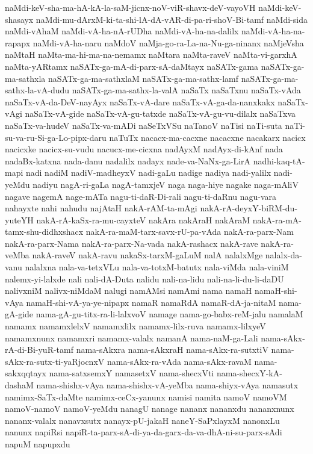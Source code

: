 {naMdi-keV-sha-ma-hA-kA-la-saM-jicnx-noV-viR-shavx-deV-vayoVH
naMdi-keV-shasayx
naMdi-mu-dArxM-ki-ta-shi-lA-dA-vAR-di-pa-ri-shoV-Bi-tamf
naMdi-sida
naMdi-vAhaM
naMdi-vA-ha-nA-rUDha
naMdi-vA-ha-na-dalilx
naMdi-vA-ha-na-rapapx
naMdi-vA-ha-naru
naMdoV
naMja-go-ra-La-na-Nu-ga-ninanx
naMjeVsha
naMtaH
naMta-ma-hi-ma-na-nemamx
naMtara
naMta-raveV
naMta-vi-garxhA
naMta-yARtamx
naSATx-ga-mA-di-parx-sA-daMtayx
naSATx-gama
naSATx-ga-ma-sathxla
naSATx-ga-ma-sathxlaM
naSATx-ga-ma-sathx-lamf
naSATx-ga-ma-sathx-la-vA-dudu
naSATx-ga-ma-sathx-la-valA
naSaTx
naSaTxnu
naSaTx-vAda
naSaTx-vA-da-DeV-nayAyx
naSaTx-vA-dare
naSaTx-vA-ga-da-nanxkakx
naSaTx-vAgi
naSaTx-vA-gide
naSaTx-vA-gu-tatxde
naSaTx-vA-gu-vu-dilalx
naSaTxva
naSaTx-va-hudeV
naSaTx-va-mADi
naSeTxVSu
naTanoV
naTisi
naTi-suta
naTi-su-va-ru-Si-ga-Lo-pipx-daru
naTuTx
nacacx-ma-cacxne
nacacxne
nacakarx
nacicx
nacicxke
nacicx-su-vudu
nacucx-me-cicxna
nadAyxM
nadAyx-di-kAnf
nada
nadaBx-katxna
nada-danu
nadalilx
nadayx
nade-va-NaNx-ga-LirA
nadhi-kaq-tA-mapi
nadi
nadiM
nadiV-madheyxV
nadi-gaLu
nadige
nadiya
nadi-yalilx
nadi-yeMdu
nadiyu
nagA-ri-gaLa
nagA-tamxjeV
naga
naga-hiye
nagake
naga-mAliV
nagave
nagemA
nage-mATa
nagu-ti-daR-Di-rali
nagu-ti-daRnu
nagu-vara
nahayxte
nahi
nahudu
najAtaH
nakA-rAM-ta-mAgi
nakA-rA-deyxY-biRM-du-yuteYH
nakA-rA-kaSx-ra-mu-cayxteV
nakAra
nakAraH
nakAraM
nakA-ra-mA-tamx-shu-didhxshacx
nakA-ra-maM-tarx-savx-rU-pa-vAda
nakA-ra-parx-Nam
nakA-ra-parx-Nama
nakA-ra-parx-Na-vada
nakA-rashacx
nakA-rave
nakA-ra-veMba
nakA-raveV
nakA-ravu
nakaSx-tarxM-gaLuM
nalA
nalalxMge
nalalx-da-vanu
nalalxna
nala-va-tetxVLu
nala-va-totxM-batutx
nala-viMda
nala-viniM
nalemx-yi-lalxde
nali
nali-dA-Duta
nalidu
nali-na-lidu
nali-na-li-du-li-daDU
nalivxniM
nalivx-niMdaM
nalugi
namAMsi
namAmi
nama
namaH
namaH-shi-vAya
namaH-shi-vA-ya-ye-nipapx
namaR
namaRdA
namaR-dA-ja-nitaM
nama-gA-gide
nama-gA-gu-titx-ra-li-lalxvoV
namage
nama-go-babx-reM-jalu
namalaM
namamx
namamxlelxV
namamxlilx
namamx-lilx-ruva
namamx-lilxyeV
namamxnunx
namamxri
namamx-valalx
namanA
nama-naM-ga-Lali
nama-sAkx-rA-di-Bi-yuR-tamf
nama-sAkxra
nama-sAkxraH
nama-sAkx-ra-sutxtiV
nama-sAkx-ra-sutx-ti-yaRjocnxV
nama-sAkx-ra-vAda
nama-sAkx-ravaM
nama-sakxqqtayx
nama-satxsemxY
namasetxV
nama-shecxVti
nama-shecxY-kA-dashaM
nama-shishx-vAya
nama-shishx-vA-yeMba
nama-shiyx-vAya
namasutx
namimx-SaTx-daMte
namimx-ceCx-yanunx
namisi
namita
namoV
namoVM
namoV-namoV
namoV-yeMdu
nanagU
nanage
nananx
nananxdu
nananxnunx
nananx-valalx
nanavxsutx
nanayx-pU-jakaH
naneY-SaPxlayxM
nanonxLu
nanunx
napiRsi
napiR-ta-parx-sA-di-ya-da-garx-da-va-dhA-ni-su-parx-sAdi
napuM
napupxdu
}
